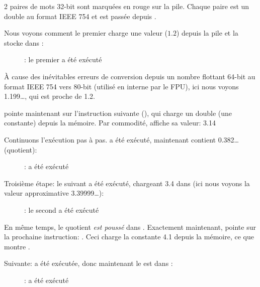 ﻿\clearpage
{}
\myindex{\olly}

2 paires de mots 32-bit sont marquées en rouge sur la pile.
Chaque paire est un double au format IEEE 754 et est passée depuis \main.

Nous voyons comment le premier \FLD charge une valeur ($1.2$) depuis la pile et la
stocke dans :

\begin{figure}[H]
\centering
{}
\caption{\olly: le premier \FLD a été exécuté}
\label{fig:FPU_simple_olly_1}
\end{figure}

À cause des inévitables erreurs de conversion depuis un nombre flottant 64-bit au
format IEEE 754 vers 80-bit (utilisé en interne par le FPU), ici nous voyons 1.199\ldots,
qui est proche de 1.2.

\EIP pointe maintenant sur l'instruction suivante (\FDIV), qui charge un double
(une constante) depuis la mémoire.
Par commodité, \olly affiche sa valeur: 3.14

\clearpage
Continuons l'exécution pas à pas.
\FDIV a été exécuté, maintenant  contient 0.382\ldots
(\gls{quotient}):

\begin{figure}[H]
\centering
{}
\caption{\olly: \FDIV a été exécuté}
\label{fig:FPU_simple_olly_2}
\end{figure}

\clearpage
Troisième étape: le \FLD suivant a été exécuté, chargeant 3.4 dans  (ici nous
voyons la valeur approximative 3.39999\ldots):

\begin{figure}[H]
\centering
{}
\caption{\olly: le second \FLD a été exécuté}
\label{fig:FPU_simple_olly_3}
\end{figure}

En même temps, le \gls{quotient} \emph{est poussé} dans .
Exactement maintenant, \EIP pointe sur la prochaine instruction: \FMUL.
Ceci charge la constante 4.1 depuis la mémoire, ce que montre \olly.

\clearpage
Suivante: \FMUL a été exécutée, donc maintenant le  est dans :

\begin{figure}[H]
\centering
{}
\caption{\olly: \FMUL a été exécuté}
\label{fig:FPU_simple_olly_4}
\end{figure}

